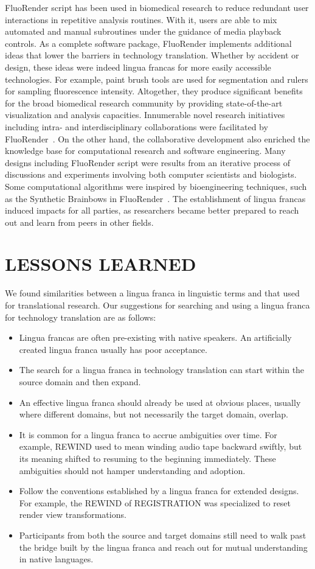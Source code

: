\documentclass{IEEEcsmag}
\begin{document}
FluoRender script has been used in biomedical research to reduce redundant user interactions in repetitive analysis routines. With it, users are able to mix automated and manual subroutines under the guidance of media playback controls. As a complete software package, FluoRender implements additional ideas that lower the barriers in technology translation. Whether by accident or design, these ideas were indeed lingua francas for more easily accessible technologies. For example, paint brush tools are used for segmentation and rulers for sampling fluorescence intensity. Altogether, they produce significant benefits for the broad biomedical research community by providing state-of-the-art visualization and analysis capacities. Innumerable novel research initiatives including intra- and interdisciplinary collaborations were facilitated by FluoRender~\cite{eight}.
On the other hand, the collaborative development also enriched the knowledge base for computational research and software engineering. Many designs including FluoRender script were results from an iterative process of discussions and experiments involving both computer scientists and biologists. Some computational algorithms were inspired by bioengineering techniques, such as the Synthetic Brainbows in FluoRender~\cite{nine}. The establishment of lingua francas induced impacts for all parties, as researchers became better prepared to reach out and learn from peers in other fields.

\section{LESSONS LEARNED}

We found similarities between a lingua franca in linguistic terms and that used for translational research. Our suggestions for searching and using a lingua franca for technology translation are as follows:

\begin{itemize}
\item Lingua francas are often pre-existing with native speakers. An artificially created lingua franca usually has poor acceptance.
\item The search for a lingua franca in technology translation can start within the source domain and then expand.
\item An effective lingua franca should already be used at obvious places, usually where different domains, but not necessarily the target domain, overlap.
\item It is common for a lingua franca to accrue ambiguities over time. For example, REWIND used to mean winding audio tape backward swiftly, but its meaning shifted to resuming to the beginning immediately. These ambiguities should not hamper understanding and adoption.
\item Follow the conventions established by a lingua franca for extended designs. For example, the REWIND of REGISTRATION was specialized to reset render view transformations.
\item Participants from both the source and target domains still need to walk past the bridge built by the lingua franca and reach out for mutual understanding in native languages.
\end{itemize}
\end{document}
